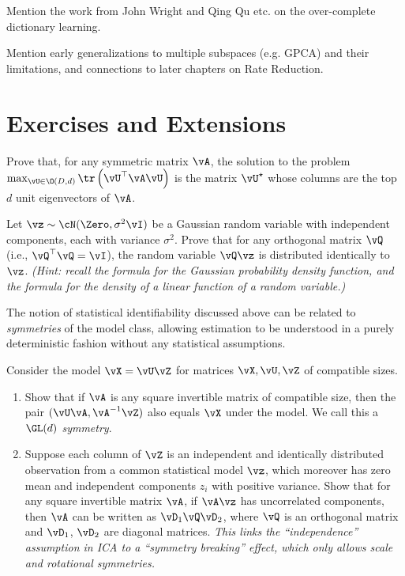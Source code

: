 \documentclass[../../book-main.tex]{subfiles}
\begin{document}
Mention the work from John Wright and Qing Qu etc. on the over-complete dictionary learning.

Mention early generalizations to multiple subspaces (e.g. GPCA) and their limitations, and connections to later chapters on Rate Reduction.


\section{Exercises and Extensions}


\begin{exercise}\label{exercise:principal-components-derivation}
    Prove that, for any symmetric matrix \(\vA\), the solution to the problem
    \(\max_{\vU \in \O(D, d)}\tr\left(\vU^{\top}\vA\vU\right)\) is the matrix
    \(\vU^{\star}\) whose columns are the top \(d\) unit eigenvectors of \(\vA\).
\end{exercise}

\begin{exercise}\label{exercise:gaussian-rot-invar}
    Let $\vz \sim \cN(\Zero, \sigma^2 \vI)$ be a Gaussian random variable with independent components, each with variance $\sigma^2$. 
    Prove that for any orthogonal matrix $\vQ$ (i.e., $\vQ^\top \vQ = \vI$), the random variable $\vQ \vz$ is distributed identically to $\vz$. 
    \textit{(Hint: recall the formula for the Gaussian probability density function, and the formula for the density of a linear function of a random variable.) }
\end{exercise}

\begin{exercise}\label{exercise:symmetry-identifiability}
    The notion of statistical identifiability discussed above can be related to \textit{symmetries} of the model class, allowing estimation to be understood in a purely deterministic fashion without any statistical assumptions.

    Consider the model $\vX = \vU \vZ$ for matrices $\vX, \vU, \vZ$ of compatible sizes.
    \begin{enumerate}
        \item Show that if $\vA$ is any square invertible matrix of compatible size, then the pair
        $(\vU \vA, \vA^{-1} \vZ)$ also equals $\vX$ under the model. We call this a \textit{$\GL(d)$ symmetry}.
        \item Suppose each column of $\vZ$ is an independent and identically distributed observation from a common statistical model $\vz$, which moreover has zero mean and independent components $z_i$ with positive variance.
        Show that for any square invertible matrix $\vA$, if $\vA \vz$ has uncorrelated components, then $\vA$ can be written as $\vD_1 \vQ \vD_2$, where $\vQ$ is an orthogonal matrix and $\vD_1$, $\vD_2$ are diagonal matrices.
        \textit{This links the ``independence'' assumption in ICA to a ``symmetry breaking'' effect, which only allows scale and rotational symmetries.}
    \end{enumerate}

\end{exercise}
\end{document}

